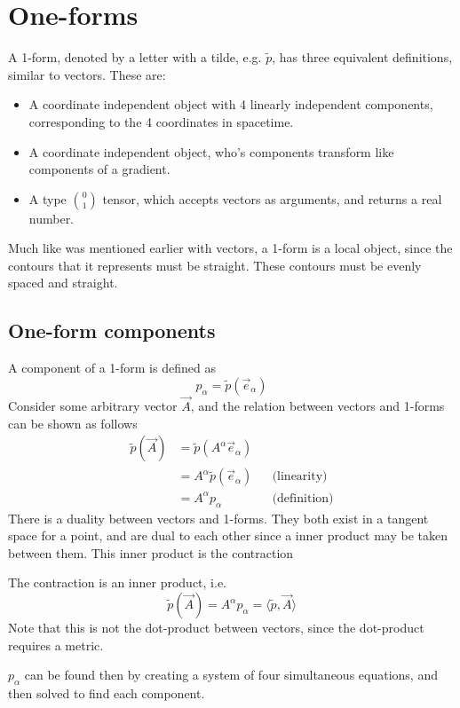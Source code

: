 \section{One-forms}
A 1-form, denoted by a letter with a tilde, e.g. $\widetilde{p}$, has three equivalent definitions, similar to vectors. These are:
\begin{itemize}
    \item A coordinate independent object with 4 linearly independent components, corresponding to the 4 coordinates in spacetime.
    \item A coordinate independent object, who's components transform like components of a gradient.
    \item A type $\binom{0}{1}$ tensor, which accepts vectors as arguments, and returns a real number.
\end{itemize}

Much like was mentioned earlier with vectors, a 1-form is a local object, since the contours that it represents must be straight. These contours must be evenly spaced and straight.
\subsection{One-form components}
A component of a 1-form is defined as 
$$ p_\alpha = \widetilde{p}(\vec{e}_\alpha) $$
Consider some arbitrary vector $\vec{A}$, and the relation between vectors and 1-forms can be shown as follows
\begin{align*}
    \widetilde{p}(\vec{A}) & = \widetilde{p}(A^\alpha \vec{e}_\alpha) \\ & = A^\alpha \widetilde{p}(\vec{e}_\alpha) && \text{(linearity)} \\ & = A^\alpha p_\alpha && \text{(definition)}
\end{align*}
There is a duality between vectors and 1-forms. They both exist in a tangent space for a point, and are dual to each other since a inner product may be taken between them. This inner product is the contraction
\begin{definition}
    The contraction is an inner product, i.e.
    $$ \widetilde{p}(\vec{A}) = A^\alpha p_\alpha = \langle \widetilde{p}, \vec{A} \rangle $$
    Note that this is not the dot-product between vectors, since the dot-product requires a metric.
\end{definition}
$p_\alpha$ can be found then by creating a system of four simultaneous equations, and then solved to find each component.

